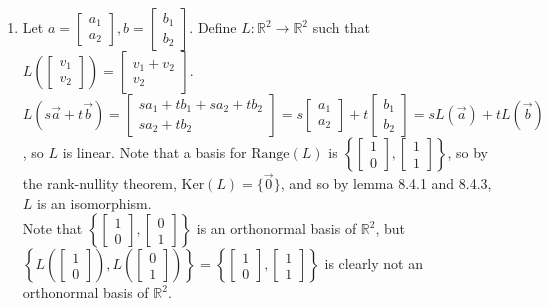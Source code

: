 \documentclass[10pt,english]{article}
\begin{document}
\begin{enumerate}
\pagebreak
\item Let $a=\begin{bmatrix}a_1\\a_2\end{bmatrix},b=\begin{bmatrix}b_1\\b_2\end{bmatrix}$. Define $L:\mathbb{R}^2\rightarrow\mathbb{R}^2$ such that $L\left(\begin{bmatrix}v_1\\v_2\end{bmatrix}\right)=\begin{bmatrix}v_1+v_2\\v_2\end{bmatrix}$. $L(s\vec{a}+t\vec{b})=\begin{bmatrix}sa_1+tb_1+sa_2+tb_2\\sa_2+tb_2\end{bmatrix}=s\begin{bmatrix}a_1\\a_2\end{bmatrix}+t\begin{bmatrix}b_1\\b_2\end{bmatrix}=sL(\vec{a})+tL(\vec{b})$, so $L$ is linear. Note that a basis for $\text{Range}(L)$ is $\left\{\begin{bmatrix}1\\0\end{bmatrix},\begin{bmatrix}1\\1\end{bmatrix}\right\}$, so by the rank-nullity theorem, $\text{Ker}(L)=\{\vec{0}\}$, and so by lemma 8.4.1 and 8.4.3, $L$ is an isomorphism. \\ 
Note that $\left\{\begin{bmatrix}1\\0\end{bmatrix},\begin{bmatrix}0\\1\end{bmatrix}\right\}$ is an orthonormal basis of $\mathbb{R}^2$, but $\left\{L\left(\begin{bmatrix}1\\0\end{bmatrix}\right),L\left(\begin{bmatrix}0\\1\end{bmatrix}\right)\right\}=\left\{\begin{bmatrix}1\\0\end{bmatrix},\begin{bmatrix}1\\1\end{bmatrix}\right\}$ is clearly not an orthonormal basis of $\mathbb{R}^2$. 


\end{enumerate}
\end{document}
